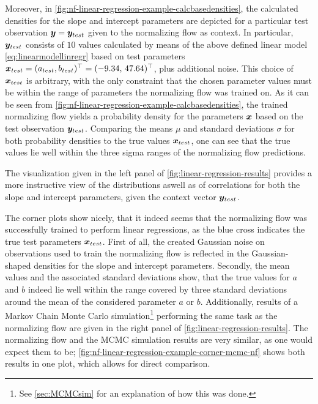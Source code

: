 \documentclass[a4paper,12pt]{report}
\begin{document}
Moreover, in \cref{fig:nf-linear-regression-example-calcbasedensities}, the calculated densities for the slope and intercept parameters are depicted for a particular test observation $\bm{y} = \bm{y}_{test}$ given to the normalizing flow as context. In particular, $\bm{y}_{test}$ consists of $10$ values calculated by means of the above defined linear model \cref{eq:linearmodellinregr} based on test parameters $\bm{x}_{test} = (a_{test},b_{test})^\top = (-9.34, \,47.64)^\top$, plus additional noise. This choice of $\bm{x}_{test}$ is arbitrary, with the only constraint that the chosen parameter values must be within the range of parameters the normalizing flow was trained on. As it can be seen from \cref{fig:nf-linear-regression-example-calcbasedensities}, the trained normalizing flow yields a probability density for the parameters $\bm{x}$ based on the test observation $\bm{y}_{test}$. Comparing the means $\mu$ and standard deviations $\sigma$ for both probability densities to the true values $\bm{x}_{test}$, one can see that the true values lie well within the three sigma ranges of the normalizing flow predictions.

The visualization given in the left panel of  \cref{fig:linear-regression-results} provides a more instructive view of the distributions aswell as of correlations for both the slope and intercept parameters, given the context vector $\bm{y}_{test}$.

The corner plots show nicely, that it indeed seems that the normalizing flow was successfully trained to perform linear regressions, as the blue cross indicates the true test parameters $\bm{x}_{test}$. First of all, the created Gaussian noise on observations used to train the normalizing flow is reflected in the Gaussian-shaped densities for the slope and intercept parameters. Secondly, the mean values and the associated standard deviations show, that the true values for $a$ and $b$ indeed lie well within the range covered by three standard deviations around the mean of the considered parameter $a$ or $b$. Additionally, results of a Markov Chain Monte Carlo simulation\footnote{See \cref{sec:MCMCsim} for an explanation of how this was done.} performing the same task as the normalizing flow are given in the right panel of \cref{fig:linear-regression-results}. The normalizing flow and the MCMC simulation results are very similar, as one would expect them to be; \cref{fig:nf-linear-regression-example-corner-mcmc-nf} shows both results in one plot, which allows for direct comparison.
\end{document}
